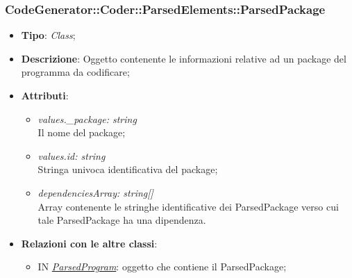 \documentclass[../DefinizioneDiProdotto.tex]{subfiles}
\begin{document}
			\subsubsection{CodeGenerator::Coder::ParsedElements::ParsedPackage}
			\hypertarget{SWEDesigner::Server::CodeGenerator::Coder::ParsedElements::ParsedPackage}{}
			\begin{itemize}
				\item \textbf{Tipo}: \emph{Class};
				\item \textbf{Descrizione}: Oggetto contenente le informazioni relative ad un package del programma da codificare;
				\item \textbf{Attributi}:
				\begin{itemize}
					\item \emph{values.\_package: string}\\
					Il nome del package;
					\item \emph{values.id: string} \\
					Stringa univoca identificativa del package;
					\item \emph{dependenciesArray: string[]} \\
					Array contenente le stringhe identificative dei ParsedPackage verso cui tale ParsedPackage ha una dipendenza.
				\end{itemize}
				\item \textbf{Relazioni con le altre classi}:
				\begin{itemize}
					\item IN \hyperlink{SWEDesigner::Server::CodeGenerator::Coder::ParsedElements::ParsedProgram}{\emph{ParsedProgram}}: oggetto che contiene il ParsedPackage;
				\end{itemize}
			\end{itemize}	
		
\end{document}
